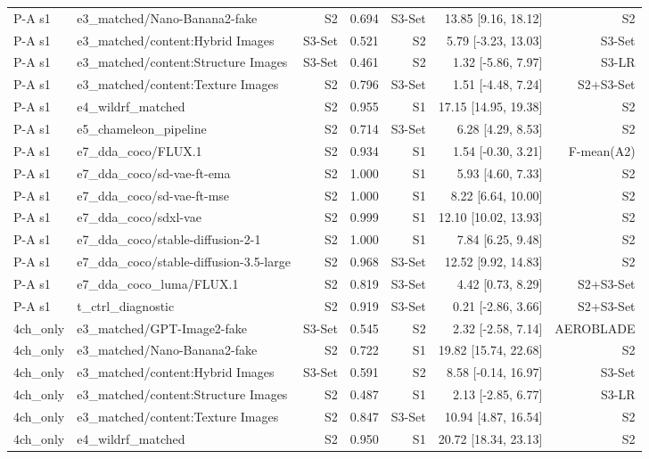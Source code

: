 \begin{table}[htbp]
\begin{tabular}{llrrrrr}
P-A s1 & e3\_matched/Nano-Banana2-fake & S2 & 0.694 & S3-Set & 13.85 [9.16, 18.12] & S2 \\
P-A s1 & e3\_matched/content:Hybrid Images & S3-Set & 0.521 & S2 & 5.79 [-3.23, 13.03] & S3-Set \\
P-A s1 & e3\_matched/content:Structure Images & S3-Set & 0.461 & S2 & 1.32 [-5.86, 7.97] & S3-LR \\
P-A s1 & e3\_matched/content:Texture Images & S2 & 0.796 & S3-Set & 1.51 [-4.48, 7.24] & S2+S3-Set \\
P-A s1 & e4\_wildrf\_matched & S2 & 0.955 & S1 & 17.15 [14.95, 19.38] & S2 \\
P-A s1 & e5\_chameleon\_pipeline & S2 & 0.714 & S3-Set & 6.28 [4.29, 8.53] & S2 \\
P-A s1 & e7\_dda\_coco/FLUX.1 & S2 & 0.934 & S1 & 1.54 [-0.30, 3.21] & F-mean(A2) \\
P-A s1 & e7\_dda\_coco/sd-vae-ft-ema & S2 & 1.000 & S1 & 5.93 [4.60, 7.33] & S2 \\
P-A s1 & e7\_dda\_coco/sd-vae-ft-mse & S2 & 1.000 & S1 & 8.22 [6.64, 10.00] & S2 \\
P-A s1 & e7\_dda\_coco/sdxl-vae & S2 & 0.999 & S1 & 12.10 [10.02, 13.93] & S2 \\
P-A s1 & e7\_dda\_coco/stable-diffusion-2-1 & S2 & 1.000 & S1 & 7.84 [6.25, 9.48] & S2 \\
P-A s1 & e7\_dda\_coco/stable-diffusion-3.5-large & S2 & 0.968 & S3-Set & 12.52 [9.92, 14.83] & S2 \\
P-A s1 & e7\_dda\_coco\_luma/FLUX.1 & S2 & 0.819 & S3-Set & 4.42 [0.73, 8.29] & S2+S3-Set \\
P-A s1 & t\_ctrl\_diagnostic & S2 & 0.919 & S3-Set & 0.21 [-2.86, 3.66] & S2+S3-Set \\
4ch\_only & e3\_matched/GPT-Image2-fake & S3-Set & 0.545 & S2 & 2.32 [-2.58, 7.14] & AEROBLADE \\
4ch\_only & e3\_matched/Nano-Banana2-fake & S2 & 0.722 & S1 & 19.82 [15.74, 22.68] & S2 \\
4ch\_only & e3\_matched/content:Hybrid Images & S3-Set & 0.591 & S2 & 8.58 [-0.14, 16.97] & S3-Set \\
4ch\_only & e3\_matched/content:Structure Images & S2 & 0.487 & S1 & 2.13 [-2.85, 6.77] & S3-LR \\
4ch\_only & e3\_matched/content:Texture Images & S2 & 0.847 & S3-Set & 10.94 [4.87, 16.54] & S2 \\
4ch\_only & e4\_wildrf\_matched & S2 & 0.950 & S1 & 20.72 [18.34, 23.13] & S2 \\

\end{tabular}
\end{table}
